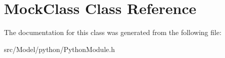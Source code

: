 \hypertarget{classMockClass}{}\section{Mock\+Class Class Reference}
\label{classMockClass}


The documentation for this class was generated from the following file\+:\begin{DoxyCompactItemize}
\item 
src/\+Model/python/Python\+Module.\+h\end{DoxyCompactItemize}
